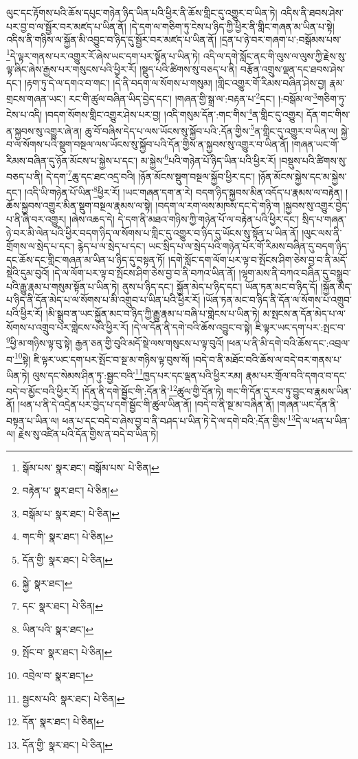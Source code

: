 ལུང་དང་རྟོགས་པའི་ཆོས་དཔུང་གཉེན་ཉིད་ཡིན་པའི་ཕྱིར་ནི་ཆོས་གླིང་དུ་འགྱུར་བ་ཡིན་ཏེ། འདིས་ནི་ཐབས་ཤེས་པར་བྱ་བ་ལ་སྦྱོར་བར་མཛད་པ་ཡིན་ནོ། །དེ་དག་ལ་གཅིག་ཏུ་ངེས་པ་ཉིད་ཀྱི་ཕྱིར་ནི་གླིང་གཞན་མ་ཡིན་པ་སྟེ། འདིས་ནི་གཉིས་ལ་སྐྱོན་མི་འབྱུང་བ་ཉིད་དུ་སྦྱོར་བར་མཛད་པ་ཡིན་ནོ། །དྲན་པ་ཉེ་བར་གཞག་པ་:བསྒོམས་པས་\footnote{སྒོམ་པས་  སྣར་ཐང་། བསྒོམ་པས་  པེ་ཅིན། }དེ་ལྟར་གནས་པར་འགྱུར་རོ་ཞེས་ཡང་དག་པར་སྟོན་པ་ཡིན་ཏེ། འདི་ལ་དགེ་སློང་ནང་གི་ལུས་ལ་ལུས་ཀྱི་རྗེས་སུ་ལྟ་ཞིང་ཞེས་རྒྱས་པར་གསུངས་པའི་ཕྱིར་རོ། །སྡུད་པའི་ཚིགས་སུ་བཅད་པ་ནི། བརྩོན་འགྲུས་ལྡན་དང་ཐབས་ཤེས་དང་། །རྟག་ཏུ་དེ་ལ་དགའ་བ་གང་། །དེ་ནི་བདག་ལ་སོགས་པ་གསུམ། །གླིང་འགྱུར་གོ་རིམས་བཞིན་ཤེས་བྱ། རྣམ་གྲངས་གཞན་ཡང་། རང་གི་ཚུལ་བཞིན་ཡིད་བྱེད་དང་། །གཞན་གྱི་སྒྲ་ལ་:བརྟན་པ་\footnote{བརྟེན་པ་  སྣར་ཐང་།  པེ་ཅིན། }དང་། །:བསྒོམ་ལ་\footnote{བསྒོམ་པ་  སྣར་ཐང་།  པེ་ཅིན། }གཅིག་ཏུ་ངེས་པ་འདི། །བདག་སོགས་གླིང་འགྱུར་ཤེས་པར་བྱ། །འདི་གསུམ་དོན་:གང་གིས་\footnote{གང་གི་  སྣར་ཐང་།  པེ་ཅིན། }ན་གླིང་དུ་འགྱུར། དོན་གང་གིས་ན་སྐྱབས་སུ་འགྱུར་ཞེ་ན། ཆུ་བོ་བཞིས་དེད་པ་ལས་ཡོངས་སུ་སྐྱོབ་པའི་:དོན་གྱིས་\footnote{དོན་གྱི་  སྣར་ཐང་།  པེ་ཅིན། }ན་གླིང་དུ་འགྱུར་བ་ཡིན་ལ། སྐྱེ་བ་ལ་སོགས་པའི་སྡུག་བསྔལ་ལས་ཡོངས་སུ་སྐྱོབ་པའི་དོན་གྱིས་ན་སྐྱབས་སུ་འགྱུར་བ་ཡིན་ནོ། །གཞན་ཡང་གོ་རིམས་བཞིན་དུ་ཉོན་མོངས་པ་སྐྱེས་པ་དང་། མ་སྐྱེས་\footnote{སྐྱེ་  སྣར་ཐང་། }པའི་གཉེན་པོ་ཉིད་ཡིན་པའི་ཕྱིར་རོ། །བསྡུས་པའི་ཚིགས་སུ་བཅད་པ་ནི། དེ་དག་\footnote{དང་  སྣར་ཐང་།  པེ་ཅིན། }ཆུ་དང་ཐང་འདྲ་བའི། །ཉོན་མོངས་སྡུག་བསྔལ་སྐྱོབ་ཕྱིར་དང་། །ཉོན་མོངས་སྐྱེས་དང་མ་སྐྱེས་དང་། །འདི་ཡི་གཉེན་པོ་ཡིན་\footnote{ཡིན་པའི་  སྣར་ཐང་། }ཕྱིར་རོ། །ཡང་གཞན་དག་ན་རེ། བདག་ཉིད་སྐྱབས་མིན་འདོད་པ་རྣམས་ལ་བརྟེན། །ཆོས་སྐྱབས་འགྱུར་མིན་སྡུག་བསྔལ་རྣམས་ལ་སྟེ། །བདག་ལ་རག་ལས་མཁས་དང་དེ་གཉི་ག །སྐྱབས་སུ་འགྱུར་བྱེད་པ་ནི་ཞི་བར་འགྱུར། །ཞེས་འཆད་དེ། དེ་དག་ནི་མཐའ་གཉིས་ཀྱི་གཉེན་པོ་ལ་བརྟེན་པའི་ཕྱིར་དང་། སྲིད་པ་གཞན་ཉེ་བར་མི་ལེན་པའི་ཕྱིར་བདག་ཉིད་ལ་སོགས་པ་གླིང་དུ་འགྱུར་བ་ཉིད་དུ་ཡོངས་སུ་སྟོན་པ་ཡིན་ནོ། །ལུང་ལས་ནི་གྲོགས་ལ་སྲེད་པ་དང་། རྙེད་པ་ལ་སྲེད་པ་དང་། ཡང་སྲིད་པ་ལ་སྲེད་པའི་གཉེན་པོར་གོ་རིམས་བཞིན་དུ་བདག་ཉིད་དང་ཆོས་དང་གླིང་གཞན་མ་ཡིན་པ་ཉིད་དུ་བསྟན་ཏོ། །དགེ་སློང་དག་ལོག་པར་ལྟ་བ་སྤོངས་ཤིག་ཅེས་བྱ་བ་ནི་མདོ་སྡེའི་དུམ་བུའོ། །དེ་ལ་ལོག་པར་ལྟ་བ་སྤོངས་ཤིག་ཅེས་བྱ་བ་ནི་བཀའ་ཡིན་ནོ། །ལྷག་མས་ནི་བཀའ་བཞིན་དུ་བསྒྲུབ་པའི་རྒྱུ་རྣམ་པ་གསུམ་སྟོན་པ་ཡིན་ཏེ། ནུས་པ་ཉིད་དང་། སྐྱོན་མེད་པ་ཉིད་དང་། ཡོན་ཏན་མང་བ་ཉིད་དོ། །སྐྱོན་མེད་པ་ཉིད་ནི་དོན་མེད་པ་ལ་སོགས་པ་མི་འགྲུབ་པ་ཡིན་པའི་ཕྱིར་རོ། །ཡོན་ཏན་མང་བ་ཉིད་ནི་དོན་ལ་སོགས་པ་འགྲུབ་པའི་ཕྱིར་རོ། །མི་སྒྲུབ་ན་ཡང་སྐྱོན་མང་བ་ཉིད་ཀྱི་རྒྱུ་རྣམ་པ་བཞི་པ་གླེངས་པ་ཡིན་ཏེ། མ་སྤངས་ན་དོན་མེད་པ་ལ་སོགས་པ་འགྲུབ་པར་གླེངས་པའི་ཕྱིར་རོ། །དེ་ལ་དོན་ནི་དགེ་བའི་ཆོས་འབྱུང་བ་སྟེ། ཇི་ལྟར་ཡང་དག་པར་:སྤང་བ་\footnote{སྤོང་བ་  སྣར་ཐང་།  པེ་ཅིན། }ཕྱི་མ་གཉིས་ལྟ་བུ་སྟེ། རྒྱན་ཅན་གྱི་བུའི་མདོ་སྡེ་ལས་གསུངས་པ་ལྟ་བུའོ། །ཕན་པ་ནི་མི་དགེ་བའི་ཆོས་དང་:འབྲལ་བ་\footnote{འབྲེལ་བ་  སྣར་ཐང་། }སྟེ། ཇི་ལྟར་ཡང་དག་པར་སྤོང་བ་སྔ་མ་གཉིས་ལྟ་བུས་སོ། །བདེ་བ་ནི་མཐོང་བའི་ཆོས་ལ་བདེ་བར་གནས་པ་ཡིན་ཏེ། ལུས་དང་སེམས་ཤིན་ཏུ་:སྦྱང་བའི་\footnote{སྦྱངས་པའི་  སྣར་ཐང་།  པེ་ཅིན། }ཁྱད་པར་དང་ལྡན་པའི་ཕྱིར་རམ། རྣམ་པར་གྲོལ་བའི་དགའ་བ་དང་བདེ་བ་མྱོང་བའི་ཕྱིར་རོ། །དོན་ནི་དགེ་སྦྱོང་གི་:དོན་ནི་\footnote{དོན་  སྣར་ཐང་།  པེ་ཅིན། }ཚུལ་གྱི་དོན་ཏེ། གང་གི་དོན་དུ་རབ་ཏུ་བྱུང་བ་རྣམས་ཡིན་ནོ། །ཕན་པ་ནི་དེ་འདྲེན་པར་བྱེད་པ་དགེ་སྦྱོང་གི་ཚུལ་ཡིན་ནོ། །བདེ་བ་ནི་སྔ་མ་བཞིན་ནོ། །གཞན་ཡང་དོན་ནི་བསྟན་པ་ཡིན་ལ། ཕན་པ་དང་བདེ་བ་ཞེས་བྱ་བ་ནི་བཤད་པ་ཡིན་ཏེ་དེ་ལ་དགེ་བའི་:དོན་གྱིས་\footnote{དོན་གྱི་  སྣར་ཐང་།  པེ་ཅིན། }དེ་ལ་ཕན་པ་ཡིན་ལ། རྗེས་སུ་འཛིན་པའི་དོན་གྱིས་ན་བདེ་བ་ཡིན་ཏེ། 